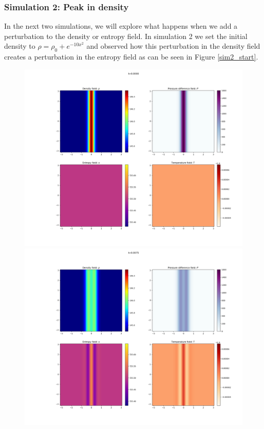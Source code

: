 \documentclass{article}
\begin{document}
\subsubsection{Simulation 2: Peak in density}
In the next two simulations, we will explore what happens when we add a perturbation to the density or entropy field.
In simulation 2 we set the initial density to \(\rho = \rho_0 + e^{-10x^2}\) and observed how this perturbation in the density field creates a perturbation in the entropy field as can be seen in Figure \ref{sim2_start}.

\begin{figure}[h]
    \includegraphics[width=\textwidth/3]{Sim 2/SF02_0000.png}
    \includegraphics[width=\textwidth/3]{Sim 2/SF02_0003.png}

\end{figure}
\end{document}
